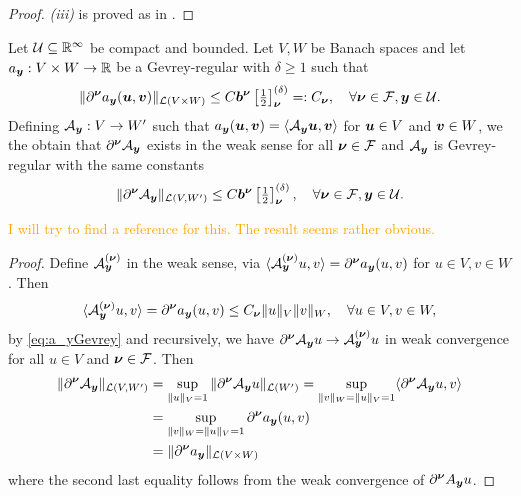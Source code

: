 \begin{proof}
\emph{(iii)} is proved as in \cite[Lemma~2]{chernov2026gevreyclassregularitysteadystate}.

\end{proof}
\begin{lemma} \label{lemma:RepresenterBilinearFormRegularity}
Let $\mathcal{U} \subseteq \mathbb{R}^\infty$ be compact and bounded. Let $V, W$ be Banach spaces and let $a_{\boldsymbol{y}}: V \times W \to \mathbb{R}$ be a Gevrey-regular with $\delta \geq 1 $ such that 
 \begin{align}\label{eq:a_yGevrey}
      \| \partial^{\boldsymbol{\nu}} a_{\boldsymbol{y}}( {\boldsymbol{u}}, {\boldsymbol{v}} ) \|_{\mathcal{L}(V \times W) } \leq C {\boldsymbol{b}}^{{\boldsymbol{\nu}}} \left[\tfrac{1}{2} \right]^{(\delta)}_{{\boldsymbol{\nu}}} =: C_{{\boldsymbol{\nu}}}, \quad  \forall {\boldsymbol{\nu}} \in \mathcal{F}, {\boldsymbol{y}} \in \mathcal{U}.
 \end{align}
Defining  $\mathcal{A}_{\boldsymbol{y}}: V \to W'$ such that $a_{\boldsymbol{y}}( {\boldsymbol{u}}, {\boldsymbol{v}}) =  \langle \mathcal{A}_{\boldsymbol{y}} {\boldsymbol{u}}, {\boldsymbol{v}} \rangle $ for ${\boldsymbol{u}} \in V$ and ${\boldsymbol{v}} \in W$, we the obtain that $\partial^{\boldsymbol{\nu}} \mathcal{A}_{\boldsymbol{y}}$ exists in the weak sense for all ${\boldsymbol{\nu}} \in \mathcal{F}$ and $\mathcal{A}_{\boldsymbol{y}}$ is Gevrey-regular with the same constants
  \begin{align*}
      \| \partial^{\boldsymbol{\nu}} \mathcal{A}_{\boldsymbol{y}} \|_{\mathcal{L}(V,W')} \leq C {\boldsymbol{b}}^{{\boldsymbol{\nu}}} \left[\tfrac{1}{2} \right]^{(\delta)}_{{\boldsymbol{\nu}}}, \quad  \forall {\boldsymbol{\nu}} \in \mathcal{F}, {\boldsymbol{y}} \in \mathcal{U}.
  \end{align*}
\end{lemma}
\textcolor{orange}{I will try to find a reference for this. The result seems rather obvious.}
\begin{proof} Define $\mathcal{A}_{{\boldsymbol{y}}}^{({\boldsymbol{\nu}})}$ in the weak sense, via 
$  \langle \mathcal{A}_{{\boldsymbol{y}}}^{({\boldsymbol{\nu}})} u , v \rangle = \partial^{{\boldsymbol{\nu}}} a_{{\boldsymbol{y}}}(u,v)$  for $u \in V, v \in W$. Then 
\begin{align*}
    \langle  \mathcal{A}_{{\boldsymbol{y}}}^{({\boldsymbol{\nu}})} u, v \rangle  =  \partial^{{\boldsymbol{\nu}}} a_{{\boldsymbol{y}}}(u,v) \leq C_{{\boldsymbol{\nu}}} \|u \|_V \|v\|_W,\quad \forall u \in V, v \in W,
\end{align*} by \eqref{eq:a_yGevrey} and  recursively, we have $\partial^{{\boldsymbol{\nu}}} \mathcal{A}_{{\boldsymbol{y}}}u \to  \mathcal{A}_{{\boldsymbol{y}}}^{({\boldsymbol{\nu}})}  u$ in weak convergence for all $ u \in V$ and $ {\boldsymbol{\nu}} \in \mathcal{F}$.
    Then%
    \begin{align*}
        \| \partial^{\boldsymbol{\nu}} \mathcal{A}_{\boldsymbol{y}} \|_{\mathcal{L}(V,W')} &= \sup _{ \| u \|_V= 1} \| \partial^{\boldsymbol{\nu}} \mathcal{A}_{\boldsymbol{y}} u  \|_{\mathcal{L}(W')} =  \sup _{ \| v \|_W = \| u \|_V= 1}  \langle \partial^{\boldsymbol{\nu}} \mathcal{A}_{\boldsymbol{y}} u , v \rangle \\
        &=  \sup _{ \| v \|_W = \| u \|_V= 1}  \partial^{{\boldsymbol{\nu}}} a_{{\boldsymbol{y}}}(u,v)\\
        &= \| \partial^{{\boldsymbol{\nu}}} a_{{\boldsymbol{y}}} \|_{\mathcal{L}(V \times W) } 
    \end{align*}
    where the second last equality follows from the weak convergence of $ \partial^{{\boldsymbol{\nu}}} A_{{\boldsymbol{y}}} u$.
 \end{proof}

